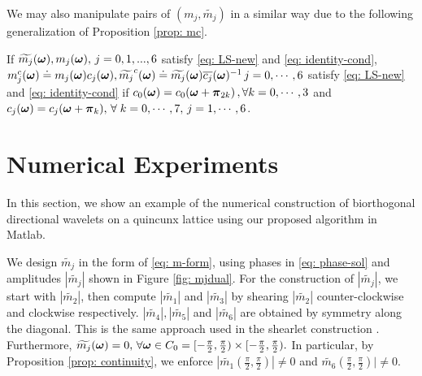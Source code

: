 We may also manipulate pairs of $(m_j,\widetilde{m_j})$ in a similar way due to the following generalization of Proposition \ref{prop: mc}.
\begin{proposition}\label{prop: mjc}
If $\widetilde{m_{j}}(\boldsymbol{\omega}), m_j(\boldsymbol{\omega}),\,  j = 0,1,...,6$ satisfy \eqref{eq: LS-new} and \eqref{eq: identity-cond}, 
$m_j^c(\boldsymbol{\omega})\doteq m_j(\boldsymbol{\omega})c_j(\boldsymbol{\omega}), \widetilde{m_j}^c(\boldsymbol{\omega})\doteq \widetilde{m_{j}}(\boldsymbol{\omega})\overline{c_j}(\boldsymbol{\omega})^{-1} \, j = 0,\cdots,6$ 
satisfy \eqref{eq: LS-new} and \eqref{eq: identity-cond} if $ c_0(\boldsymbol{\omega}) = c_0(\boldsymbol{\omega}+\boldsymbol{\pi}_{2k})\,,\forall k = 0,\cdots,3$ and $c_j(\boldsymbol{\omega}) = c_j(\boldsymbol{\omega} + \boldsymbol{\pi}_k),\, \forall \;k = 0,\cdots,7,\, j = 1,\cdots,6$.
\end{proposition}

\begin{comment}
\subsection{solving $m_i$}
In the final step, we substitute $\mc{0}$ and $m_0^C(\V{\omega})$ into \eqref{eq: LS-new} and rewrite it into the following linear system,
\begin{align}\label{eq: mi}
\overline{\M}[:,2:7]\,\mathbf{m}[2:7](\V{\omega}) = 
\begin{bmatrix}
1-m_0^C\overline{\widetilde{m_0}^C}(\V{\omega})\\
0\\
-m_0^C\overline{\widetilde{m_0}^C}(\V{\omega}+\V{\pi}_2)\\
\vdots \\
0
\end{bmatrix}
=:\mathbf{b}(\V{\omega}).
\end{align}
The solution of \eqref{eq: mi} depends only on $m_0^C\overline{\widetilde{m_0}^C}$, or equivalently $m_0\overline{\widetilde{m_0}}$. 
\end{comment}

\section{Numerical Experiments}

In this section, we show an example of the numerical construction of biorthogonal directional wavelets on a quincunx lattice using our proposed algorithm in Matlab.

We design $\widetilde{m_j}$ in the form of \eqref{eq: m-form}, using phases in \eqref{eq: phase-sol} and amplitudes $|\widetilde{m_j}|$ shown in Figure \ref{fig: mjdual}. For the construction of $|\widetilde{m_j}|$, we start with $|\widetilde{m_2}|$, then compute $|\widetilde{m_1}|$ and $|\widetilde{m_3}|$ by shearing $|\widetilde{m_2}|$ counter-clockwise and clockwise respectively. $|\widetilde{m_4}|, |\widetilde{m_5}|$ and $|\widetilde{m_6}|$ are obtained by symmetry along the diagonal. This is the same approach used in the shearlet construction \cite{kutyniok2012digital}. Furthermore, $\widetilde{m_{j}}(\boldsymbol{\omega}) = 0,\,\forall \boldsymbol{\omega}\in C_0 = [-\frac{\pi}{2},\frac{\pi}{2})\times [-\frac{\pi}{2},\frac{\pi}{2}).$ In particular, by Proposition \ref{prop: continuity}, we enforce $|\widetilde{m_1}(\frac{\pi}{2},\frac{\pi}{2})|\neq 0$ and $\widetilde{m_6}(\frac{\pi}{2},\frac{\pi}{2})|\neq 0$.

